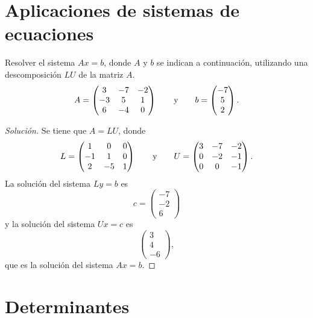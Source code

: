 \documentclass[a4,11pt]{aleph-notas}
\begin{document}
\section{Aplicaciones de sistemas de ecuaciones}

\begin{ejer}
    Resolver el sistema $Ax = b$, donde $A$ y $b$ se indican a continuación, utilizando una descomposición $LU$ de la matriz $A$.
    \[
        A = \begin{pmatrix}
        3 & -7 & -2\\
        -3 & 5 & 1\\
        6 & -4 & 0
        \end{pmatrix} \qquad\text{y}\qquad b = \begin{pmatrix}
        -7 \\ 5 \\ 2
        \end{pmatrix}.
    \]
\end{ejer}

\begin{proof}[Solución]\hspace{0pt}
    Se tiene que $A=LU$, donde
    \[
    L = \begin{pmatrix}
    1 & 0 & 0\\
    -1 & 1 & 0\\
    2 & -5 & 1
    \end{pmatrix} \qquad\text{y}\qquad U = \begin{pmatrix}
    3 & -7 & -2\\
    0 & -2 & -1\\
    0 & 0 & -1
    \end{pmatrix}.
    \]
    La solución del sistema $Ly = b$ es
    \[
    c = \begin{pmatrix}
    -7 \\ -2 \\ 6
    \end{pmatrix}
    \]
    y la solución del sistema $Ux = c$ es
    \[
    \begin{pmatrix}
    3 \\ 4 \\ -6
    \end{pmatrix},
    \]
    que es la solución del sistema $Ax = b$.
\end{proof}

\section{Determinantes}
\end{document}
